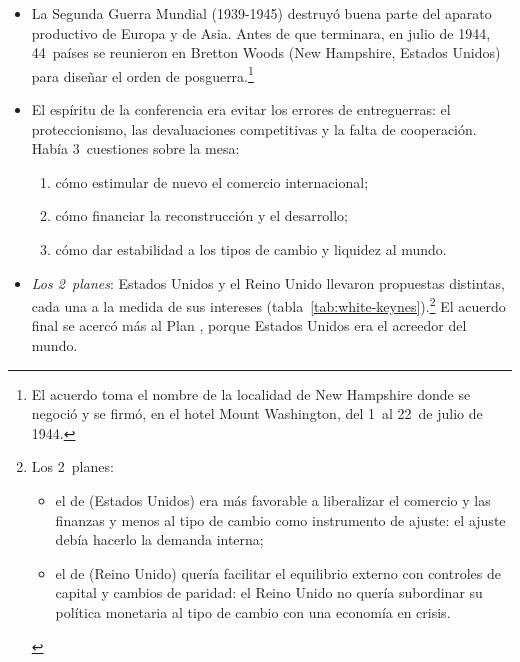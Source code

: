 \documentclass[11pt]{article}
\begin{document}
\begin{itemize}
\item La Segunda Guerra Mundial (1939-1945) destruyó buena parte del aparato productivo de Europa y de Asia. Antes de que terminara, en julio de 1944, 44~países se reunieron en Bretton Woods (New Hampshire, Estados Unidos) para diseñar el orden de posguerra.\footnote{El acuerdo toma el nombre de la localidad de New Hampshire donde se negoció y se firmó, en el hotel Mount Washington, del 1~al 22~de julio de 1944.}
\item El espíritu de la conferencia era evitar los errores de entreguerras: el proteccionismo, las devaluaciones competitivas y la falta de cooperación. Había 3~cuestiones sobre la mesa:
  \begin{enumerate}
  \item cómo estimular de nuevo el comercio internacional;
  \item cómo financiar la reconstrucción y el desarrollo;
  \item cómo dar estabilidad a los tipos de cambio y liquidez al mundo.
  \end{enumerate}
\item \emph{Los 2~planes}: Estados Unidos y el Reino Unido llevaron propuestas distintas, cada una a la medida de sus intereses (tabla~\ref{tab:white-keynes}).\footnote{Los 2~planes:
\begin{itemize}
\item el de  (Estados Unidos) era más favorable a liberalizar el comercio y las finanzas y menos al tipo de cambio como instrumento de ajuste: el ajuste debía hacerlo la demanda interna;
\item el de  (Reino Unido) quería facilitar el equilibrio externo con controles de capital y cambios de paridad: el Reino Unido no quería subordinar su política monetaria al tipo de cambio con una economía en crisis.
\end{itemize}} El acuerdo final se acercó más al Plan , porque Estados Unidos era el acreedor del mundo.
\end{itemize}
\end{document}
